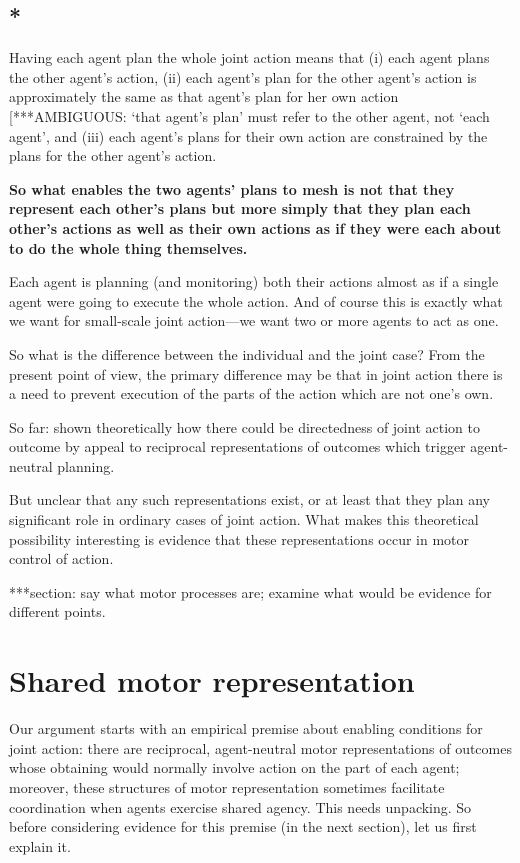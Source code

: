 \documentclass[12pt,\papersize]{extarticle}
\begin{document}
\subsection{*}
Having each agent plan the whole joint action means that (i) each agent plans the other agent's action,
(ii) each agent's plan for the other agent's action is approximately the same as that agent's plan for her own action [***AMBIGUOUS: `that agent's plan' must refer to the other agent, not `each agent',
and 
(iii) each  agent's plans for their own action are constrained by the plans for the other agent's action.

\textbf{So what enables the two agents' plans to mesh is not that they represent each other's plans but more simply that they plan each other's actions as well as their own actions as if they were each about to do the whole thing themselves.}

Each agent is planning (and monitoring) both their actions almost as if a single agent were going to execute the whole action.
And of course this is exactly what we want for small-scale joint action---we want two or more agents to act as one.

So what is the difference between the individual and the joint case?  From the present point of view, the primary difference may be that in joint action there is a need to prevent execution of the parts of the action which are not one’s own.

So far: shown theoretically how there could be directedness of joint action to outcome by appeal to reciprocal representations of outcomes which trigger agent-neutral planning.

But unclear that any such representations exist, or at least that they plan any significant role in ordinary cases of joint action.
What makes this theoretical possibility interesting is evidence that these representations occur in motor control of action.

***section: say what motor processes are; examine what would be evidence for different points.


\section{Shared motor representation}
Our argument starts with an empirical premise about enabling conditions for joint action: there are reciprocal, agent-neutral motor representations of outcomes whose obtaining would normally involve action on the part of each agent;
moreover, these structures of motor representation sometimes facilitate coordination when agents exercise shared agency.
This needs unpacking. 
So before considering evidence for this premise (in the next section), let us first explain  it.
\end{document}
